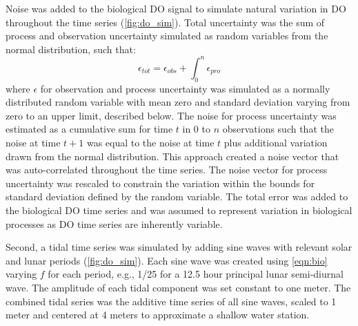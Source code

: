 \documentclass{article}\usepackage[]{graphicx}\usepackage[]{color}
\begin{document}
Noise was added to the biological DO signal to simulate natural variation in DO throughout the time series (\cref{fig:do_sim}).  Total uncertainty was the sum of process and observation uncertainty simulated as random variables from the normal distribution, such that:
\begin{equation}
\epsilon _{tot} = \epsilon _{obs} + \int_0^n \epsilon _{pro}
\end{equation}
where $\epsilon$ for observation and process uncertainty was simulated as a normally distributed random variable with mean zero and standard deviation varying from zero to an upper limit, described below.  The noise for process uncertainty was estimated as a cumulative sum for time $t$ in 0 to $n$ observations such that the noise at time $t+1$ was equal to the noise at time $t$ plus additional variation drawn from the normal distribution.  This approach created a noise vector that was auto-correlated throughout the time series.  The noise vector for process uncertainty was rescaled to constrain the variation within the bounds for standard deviation defined by the random variable. The total error was added to the biological DO time series and was assumed to represent variation in biological processes as DO time series are inherently variable. 

Second, a tidal time series was simulated by adding sine waves with relevant solar and lunar periods (\cref{fig:do_sim}).  Each sine wave was created using \cref{eqn:bio} varying $f$ for each period, e.g., 1/25 for a 12.5 hour principal lunar semi-diurnal wave.  The amplitude of each tidal component was set constant to one meter.  The combined tidal series was the additive time series of all sine waves, scaled to 1 meter and centered  at 4 meters to approximate a shallow water station.
\end{document}
